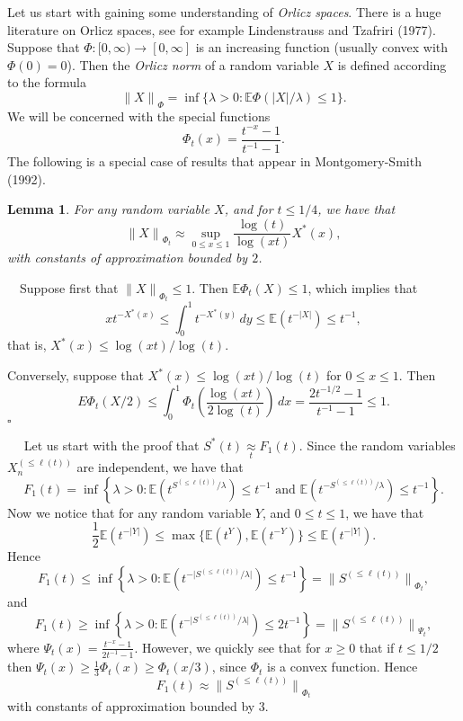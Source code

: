 \documentclass[12pt]{article}
\newtheorem{lemma}[thm]{Lemma}
\newcommand{\E}{{\mathbb E}}
\newcommand{\approxsb}[1]{\mathrel{\mathop{\approx}\limits_{#1}}}
\newcommand{\smodo}[1]{{\mathopen|#1\mathclose|}}
\newcommand{\snormo}[1]{{\mathopen\|#1\mathclose\|}}
\newcommand{\Proof}{\medskip\noindent{\bf Proof:}\ \ }
\newcommand{\Proofof}[1]{\medskip\noindent{\bf Proof of #1:}\ \ }
\newcommand{\qed}{\leavevmode\unskip\penalty9999
                  \hbox{}\nobreak\hfill$\square$\goodbreak\medskip}
\begin{document}
Let us start with gaining some understanding of
{\em Orlicz spaces}. There is a huge literature on Orlicz spaces,
see for example Lindenstrauss and Tzafriri (1977). 
Suppose that $\Phi:[0,\infty) \to
[0,\infty]$ is an increasing function (usually convex with $\Phi(0) =
0$). Then the {\em Orlicz norm\/} of a random variable $X$ is defined 
according to 
the formula 
$$ \snormo X_\Phi = \inf\{ \lambda>0 : \E\Phi(\smodo X/\lambda) \le 1
\}.$$ 
We will be concerned with the special functions
$$\Phi_t(x) = 
{\frac{t^{-x} - 1 }{ t^{-1} - 1}} .$$ 
The following is a special case of 
results that appear in Montgomery-Smith (1992).

\begin{lemma}
\label{orlicz}
For any random variable $X$, and for $t \le 1/4$,
we have that 
$$ \snormo X_{\Phi_t} \approx \sup_{0\le x \le 1} {\frac{\log(t) }{
\log(xt)}}
X^*(x) ,$$ with constants of approximation bounded by $2$.
\end{lemma}

\Proof  Suppose first that $\snormo X_{\Phi_t} \le 1$. Then 
$\E\Phi_t(X) \le 1$, which implies that
$$ x t^{-X^*(x)} 
   \le
   \int_0^1 t^{-X^*(y)} \, dy
   \le
   \E(t^{-\smodo X})
   \le t^{-1} ,$$
that is, 
$X^*(x) \le \log(xt)/\log(t)$.

Conversely, suppose that $X^*(x) \le \log(xt)/\log(t)$ for $0\le x \le
1$. Then $$ E\Phi_t(X/2)\le \int_0^1 \Phi_t\left(\frac{\log(xt)}{
2\log(t)}\right) \, dx = {\frac{2t^{-1/2}-1
}{ t^{-1}-1}} \le 1 .$$ \qed

\Proofof{Theorem~\ref{tail}} Let us start with the proof that $S^*(t
 ) \approxsb t F_1(t)$. Since the random  variables $X_n^{(\le \ell(t))}$ 
are independent, we have that $$ F_1(t) =\inf\left\{ \lambda>0 : 
\E(t^{S^{(\le \ell(t))}/\lambda}) \le t^{-1} \text{ and } 
\E(t^{-S^{(\le \ell(t))}/\lambda}) \le t^{-1} \right\} .$$ 
Now we notice that for any random variable $Y$, and $0\le t \le 1$, we
have that$$ 
{\textstyle {\frac{1}{ 2}}} \E(t^{-\smodo Y}) \le
\max\{\E(t^Y),\E(t^{-Y})\} \le
\E(t^{-\smodo Y}) .$$ Hence $$ F_1(t) \le\inf\left\{ \lambda>0 : 
\E(t^{-\smodo{S^{(\le \ell(t))}/\lambda}}) \le t^{-1} \right\} = 
\snormo{S^{(\le \ell(t))}}_{\Phi_t} ,$$ and 
$$ F_1(t)\ge\inf\left\{ \lambda>0 :\E(t^{-\smodo{S^{(\le
\ell(t))}/\lambda}}) 
\le 2t^{-1} \right\} = \snormo{S^{(\le \ell(t))}}_{\Psi_t} ,$$ where 
$\Psi_t(x) = {\displaystyle{\frac{t^{-x} - 1}{ 2t^{-1} - 1}}}$. However,
we quickly see that for $x \ge 0$ that if $t\le 1/2$ 
then $\Psi_t(x) \ge {\frac{1}{ 3}} \Phi_t(x) \ge \Phi_t(x/3)$, since $\Phi_t$ is a
convex function. Hence $$ F_1(t)
\approx \snormo{S^{(\le \ell(t))}}_{\Phi_t} $$ 
with constants of 
approximation bounded by $3$.
\end{document}
